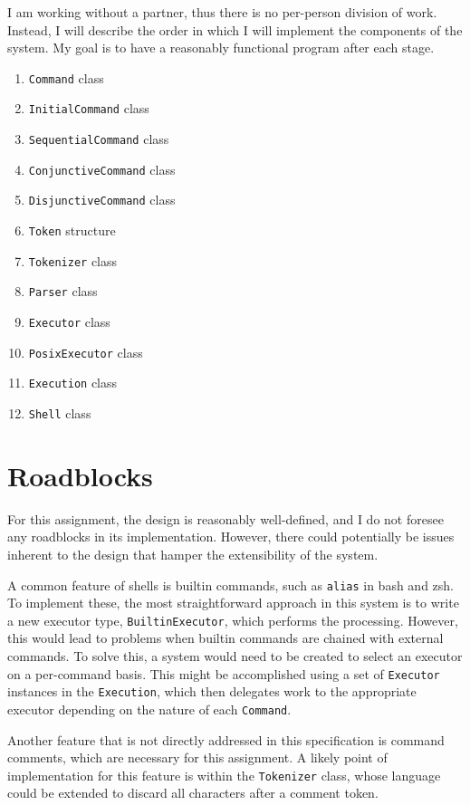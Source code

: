 \documentclass{article}
\begin{document}
  I am working without a partner, thus there is no per-person division
  of work.  Instead, I will describe the order in which I will implement
  the components of the system.  My goal is to have a reasonably
  functional program after each stage.

  \begin{enumerate}
    \item \texttt{Command} class
    \item \texttt{InitialCommand} class
    \item \texttt{SequentialCommand} class
    \item \texttt{ConjunctiveCommand} class
    \item \texttt{DisjunctiveCommand} class
    \item \texttt{Token} structure
    \item \texttt{Tokenizer} class
    \item \texttt{Parser} class
    \item \texttt{Executor} class
    \item \texttt{PosixExecutor} class
    \item \texttt{Execution} class
    \item \texttt{Shell} class
  \end{enumerate}

  \section{Roadblocks}

  For this assignment, the design is reasonably well-defined, and I do
  not foresee any roadblocks in its implementation.  However, there
  could potentially be issues inherent to the design that hamper the
  extensibility of the system.

  A common feature of shells is builtin commands, such as \texttt{alias}
  in bash and zsh.  To implement these, the most straightforward
  approach in this system is to write a new executor type,
  \texttt{BuiltinExecutor}, which performs the processing.  However,
  this would lead to problems when builtin commands are chained with
  external commands.  To solve this, a system would need to be created
  to select an executor on a per-command basis.  This might be
  accomplished using a set of \texttt{Executor} instances in the
  \texttt{Execution}, which then delegates work to the appropriate
  executor depending on the nature of each \texttt{Command}.

  Another feature that is not directly addressed in this specification
  is command comments, which are necessary for this assignment.  A
  likely point of implementation for this feature is within the
  \texttt{Tokenizer} class, whose language could be extended to discard
  all characters after a comment token.
\end{document}
